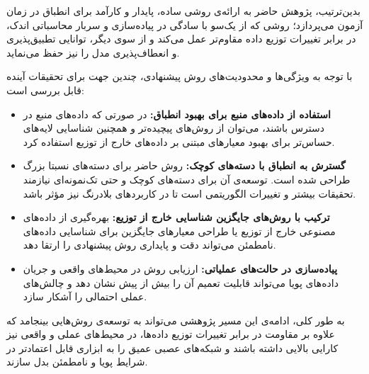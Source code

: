 بدین‌ترتیب، پژوهش حاضر به ارائه‌ی روشی ساده، پایدار و کارآمد برای انطباق در زمان آزمون می‌پردازد؛ روشی که از یک‌سو با سادگی در پیاده‌سازی و سربار محاسباتی اندک، در برابر تغییرات توزیع داده مقاوم‌تر عمل می‌کند و از سوی دیگر، توانایی تطبیق‌پذیری و انعطاف‌پذیری مدل را نیز حفظ می‌نماید.


با توجه به ویژگی‌ها و محدودیت‌های روش پیشنهادی، چندین جهت برای تحقیقات آینده قابل بررسی است:

\begin{itemize}
	\item \textbf{استفاده از داده‌های منبع برای بهبود انطباق:} در صورتی که داده‌های منبع در دسترس باشند، می‌توان از روش‌های پیچیده‌تر و همچنین شناسایی لایه‌های حساس‌تر برای بهبود معیارهای مبتنی بر داده‌های خارج از توزیع استفاده کرد.  
	
	\item \textbf{گسترش به انطباق با دسته‌های کوچک:} روش حاضر برای دسته‌های نسبتا بزرگ طراحی شده است. توسعه‌ی آن برای دسته‌های کوچک و حتی تک‌نمونه‌ای نیازمند تحقیقات بیشتر و تغییرات الگوریتمی است تا در کاربردهای بلادرنگ نیز مؤثر باشد.  
	
	\item \textbf{ترکیب با روش‌های جایگزین شناسایی خارج از توزیع:} بهره‌گیری از داده‌های مصنوعی خارج از توزیع یا طراحی معیارهای جایگزین برای شناسایی داده‌های نامطمئن می‌تواند دقت و پایداری روش پیشنهادی را ارتقا دهد.  

	\item \textbf{پیاده‌سازی در حالت‌های عملیاتی:} ارزیابی روش در محیط‌های واقعی و جریان داده‌های پویا می‌تواند قابلیت تعمیم آن را بیش از پیش نشان دهد و چالش‌های عملی احتمالی را آشکار سازد.  
\end{itemize}

به طور کلی، ادامه‌ی این مسیر پژوهشی می‌تواند به توسعه‌ی روش‌هایی بینجامد که علاوه بر مقاومت در برابر تغییرات توزیع داده‌ها، در محیط‌های عملی و واقعی نیز کارایی بالایی داشته باشند و شبکه‌های عصبی عمیق را به ابزاری قابل اعتمادتر در شرایط پویا و نامطمئن بدل سازند.  
